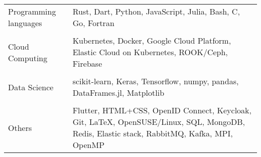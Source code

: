 \documentclass[10pt]{article}
\begin{document}
\begin{tabu} to \linewidth {lX}
Programming languages
& Rust, Dart, Python, JavaScript, Julia, Bash, C, Go, Fortran \\
&\\
Cloud Computing
& Kubernetes, Docker, Google Cloud Platform, Elastic Cloud on
  Kubernetes, ROOK/Ceph, Firebase \\
&\\
Data Science
& scikit-learn, Keras, Tensorflow, numpy, pandas, DataFrames.jl,
  Matplotlib \\
&\\
Others
& Flutter, HTML+CSS, OpenID Connect, Keycloak, Git, {\LaTeX},
  OpenSUSE/Linux, SQL, MongoDB, Redis, Elastic stack, RabbitMQ, Kafka,
  MPI, OpenMP \\
\end{tabu}
\end{document}
